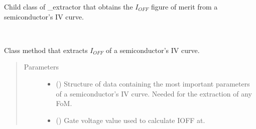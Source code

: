 \documentclass[letterpaper,10pt,english,openany, oneside]{sphinxmanual}
\begin{document}

\begin{fulllineitems}
\label{\detokenize{index:fompy.fom.ioff_ext}}
Child class of \_extractor that obtains the \(I_{OFF}\) figure of merit from a semiconductor’s IV curve.

\begin{fulllineitems}
\label{\detokenize{index:fompy.fom.ioff_ext.extraction}}~

\begin{fulllineitems}
Class method that extracts \(I_{OFF}\) of a semiconductor’s IV curve.

\end{fulllineitems}

\begin{quote}\begin{description}
\item[{Parameters}] \leavevmode\begin{itemize}
\item {} 
 () \textendash{} Structure of data containing the most important parameters of a semiconductor’s IV curve.
Needed for the extraction of any FoM.

\item {} 
 () \textendash{} Gate voltage value used to calculate IOFF at.

\end{itemize}

\end{description}\end{quote}

\end{fulllineitems}



\end{fulllineitems}
\end{document}
